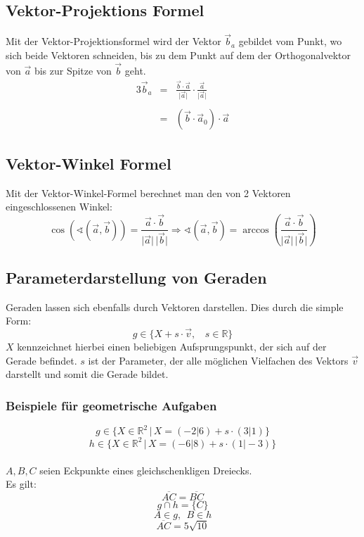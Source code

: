 \documentclass[12pt,a4paper]{scrbook}
\begin{document}
\subsection{Vektor-Projektions Formel}
Mit der Vektor-Projektionsformel wird der Vektor $\vec{b}_a$ gebildet vom Punkt, wo sich beide Vektoren
schneiden, bis zu dem Punkt auf dem der Orthogonalvektor von $\vec{a}$ bis zur Spitze von $\vec{b}$ geht. 
\begin{alignat}{3}
\vec{b}_a & = & \frac{\vec{b} \cdot \vec{a}}{\vert \vec{a} \vert} \cdot \frac{\vec{a}}{\vert \vec{a} \vert}\nonumber \\\nonumber\\
 & = & (\vec{b} \cdot \vec{a}_0) \cdot \vec{a} \nonumber 
\end{alignat}

\subsection{Vektor-Winkel Formel}
Mit der Vektor-Winkel-Formel berechnet man den von 2 Vektoren eingeschlossenen Winkel:
\[ \cos(\sphericalangle(\vec{a}, \vec{b})) = \frac{\vec{a} \cdot \vec{b}}{\vert \vec{a} \vert \, \vert \vec{b} \vert} \Longrightarrow \sphericalangle(\vec{a}, \vec{b}) = \arccos\left(\frac{\vec{a} \cdot \vec{b}}{\vert \vec{a} \vert \, \vert \vec{b} \vert} \right) \] 


\subsection{Parameterdarstellung von Geraden}
Geraden lassen sich ebenfalls durch Vektoren darstellen. Dies durch die simple Form:
\[ g \in \{X + s \cdot \vec{v}, ~~~~ s \in \mathbb{R}\} \]
$X$ kennzeichnet hierbei einen beliebigen Aufsprungspunkt, der sich auf der Gerade befindet. $s$ ist der Parameter,
der alle möglichen Vielfachen des Vektors $\vec{v}$ darstellt und somit die Gerade bildet.

\subsubsection{Beispiele für geometrische Aufgaben}
\[ g \in \{X \in \mathbb{R}^2 \, \vert \, X = (-2 \vert 6) + s \cdot (3 \vert 1)\} \]
\[ h \in \{X \in \mathbb{R}^2 \, \vert \, X = (-6 \vert 8) + s \cdot (1 \vert -3)\} \]\\
$A, B, C$ seien Eckpunkte eines gleichschenkligen Dreiecks.\\
Es gilt:\\
\[ \overline{AC} = \overline{BC} \]
\[ g \cap h = \{C\} \]
\[ A \in g, ~~ B \in h \]
\[ \overline{AC} = 5 \sqrt{10} \]\\
\end{document}
